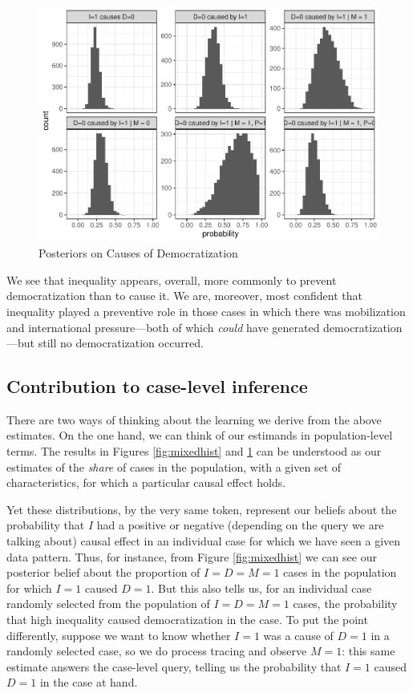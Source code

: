 \documentclass[
  12pt,
]{book}
\begin{document}
\begin{figure}

{\centering \includegraphics{ii_files/figure-latex/mixedhist2-1} 

}

\caption{Posteriors on Causes of Democratization}\label{fig:mixedhist2}
\end{figure}

We see that inequality appears, overall, more commonly to prevent democratization than to cause it. We are, moreover, most confident that inequality played a preventive role in those cases in which there was mobilization and international pressure---both of which \emph{could} have generated democratization---but still no democratization occurred.

\hypertarget{contribution-to-case-level-inference}{%
\subsection{Contribution to case-level inference}\label{contribution-to-case-level-inference}}

There are two ways of thinking about the learning we derive from the above estimates. On the one hand, we can think of our estimands in population-level terms. The results in Figures \ref{fig:mixedhist} and \ref{fig:mixedhist2} can be understood as our estimates of the \emph{share} of cases in the population, with a given set of characteristics, for which a particular causal effect holds.

Yet these distributions, by the very same token, represent our beliefs about the probability that \(I\) had a positive or negative (depending on the query we are talking about) causal effect in an individual case for which we have seen a given data pattern. Thus, for instance, from Figure \ref{fig:mixedhist} we can see our posterior belief about the proportion of \(I=D=M=1\) cases in the population for which \(I=1\) caused \(D=1\). But this also tells us, for an individual case randomly selected from the population of \(I=D=M=1\) cases, the probability that high inequality caused democratization in the case. To put the point differently, suppose we want to know whether \(I=1\) was a cause of \(D=1\) in a randomly selected case, so we do process tracing and observe \(M=1\): this same estimate answers the case-level query, telling us the probability that \(I=1\) caused \(D=1\) in the case at hand.
\end{document}
